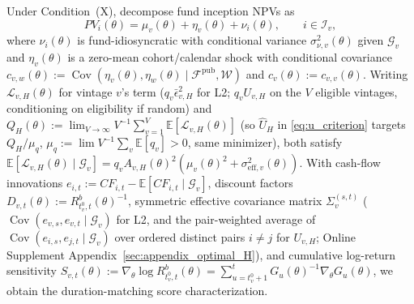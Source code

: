 \documentclass[12pt]{article}
\begin{document}
Under Condition~(X), decompose fund inception NPVs as
\begin{equation}
\label{eq:three_regime_decomp}
PV_i(\theta) = \mu_v(\theta) + \eta_v(\theta) + \nu_i(\theta),
\qquad i \in \mathcal{I}_v,
\end{equation}
where $\nu_i(\theta)$ is fund-idiosyncratic with conditional variance $\sigma_{\nu,v}^2(\theta)$ given $\mathcal{G}_v$ and $\eta_v(\theta)$ is a zero-mean cohort/calendar shock with conditional covariance $c_{v,w}(\theta) := \operatorname{Cov}(\eta_v(\theta), \eta_w(\theta) \mid \mathcal{F}^{\mathrm{pub}}, \mathcal{W})$ and $c_v(\theta) := c_{v,v}(\theta)$.
Writing $\mathcal{L}_{v,H}(\theta)$ for vintage $v$'s term ($q_v \bar\epsilon_{v,H}^2$ for L2; $q_v U_{v,H}$ on the $V$ eligible vintages, conditioning on eligibility if random) and $Q_H(\theta) := \lim_{V\to\infty} V^{-1}\sum_{v=1}^V \mathbb{E}[\mathcal{L}_{v,H}(\theta)]$ (so $\widehat{U}_H$ in \eqref{eq:u_criterion} targets $Q_H/\mu_q$, $\mu_q := \lim V^{-1}\sum_v\mathbb{E}[q_v] > 0$, same minimizer), both satisfy $\mathbb{E}[\mathcal{L}_{v,H}(\theta) \mid \mathcal{G}_v] = q_v A_{v,H}(\theta)^2(\mu_v(\theta)^2 + \sigma_{\mathrm{eff},v}^2(\theta))$.
With cash-flow innovations $e_{i,t} := CF_{i,t} - \mathbb{E}[CF_{i,t}\mid \mathcal{G}_v]$, discount factors $D_{v,t}(\theta) := R^b_{t_v^0,t}(\theta)^{-1}$, symmetric effective covariance matrix $\Sigma_v^{(s,t)}$ ($\operatorname{Cov}(e_{v,s}, e_{v,t}\mid\mathcal{G}_v)$ for L2, and the pair-weighted average of $\operatorname{Cov}(e_{i,s}, e_{j,t}\mid\mathcal{G}_v)$ over ordered distinct pairs $i \neq j$ for $U_{v,H}$; Online Supplement Appendix~\ref{sec:appendix_optimal_H}), and cumulative log-return sensitivity $S_{v,t}(\theta) := \nabla_\theta \log R^b_{t_v^0,t}(\theta) = \sum_{u=t_v^0+1}^t G_u(\theta)^{-1}\nabla_\theta G_u(\theta)$, we obtain the duration-matching score characterization.
\end{document}
